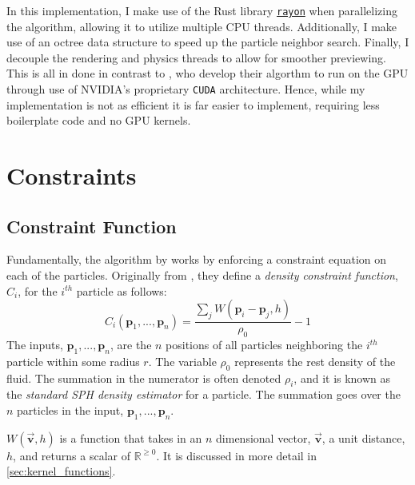 \documentclass[sigplan,screen]{acmart}
\begin{document}
In this implementation, I make use of the Rust library \href{https://docs.rs/rayon/latest/rayon/}{\texttt{rayon}} when parallelizing the algorithm, allowing it to utilize multiple CPU threads. Additionally, I make use of an octree data structure to speed up the particle neighbor search. Finally, I decouple the rendering and physics threads to allow for smoother previewing. This is all in done in contrast to \cite{Muller}, who develop their algorthm to run on the GPU through use of NVIDIA's proprietary \texttt{CUDA} architecture. Hence, while my implementation is not as efficient it is far easier to implement, requiring less boilerplate code and no GPU kernels.

\section{Constraints}
\subsection{Constraint Function}
Fundamentally, the algorithm by \cite{Muller} works by enforcing a constraint equation on each of the particles. Originally from \cite{Bodin}, they define a \textit{density constraint function}, $C_i$, for the $i^{th}$ particle as follows:
\begin{equation}
  C_i(\textbf{p}_1, ... , \textbf{p}_n) = \frac{\sum_j W(\textbf{p}_i - \textbf{p}_j, h)}{\rho_0} - 1
\end{equation}
The inputs, $\textbf{p}_1, ..., \textbf{p}_n$, are the $n$ positions of all particles neighboring the $i^{th}$ particle within some radius $r$. The variable $\rho_0$ represents the rest density of the fluid. The summation in the numerator is often denoted $\rho_i$, and it is known as the \textit{standard SPH density estimator} for a particle. The summation goes over the $n$ particles in the input, $\textbf{p}_1, ..., \textbf{p}_n$.

$W(\vec{\mathbf{v}}, h)$ is a function that takes in an $n$ dimensional vector, $\vec{\mathbf{v}}$, a unit distance, $h$, and returns a scalar of $\mathbb{R}^{\geq 0}$. It is discussed in more detail in \ref{sec:kernel_functions}.
\end{document}
